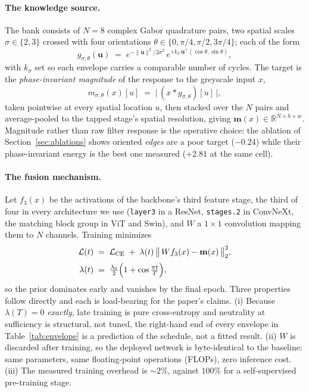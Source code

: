 \paragraph{The knowledge source.} The bank consists of $N{=}8$ complex
Gabor quadrature pairs, two spatial scales $\sigma \in \{2,3\}$ crossed
with four orientations $\theta \in \{0, \pi/4, \pi/2, 3\pi/4\}$; each
of the form
\begin{equation}
  g_{\sigma,\theta}(\mathbf{u}) \;=\;
  e^{-\lVert \mathbf{u}\rVert^{2}/2\sigma^{2}}\,
  e^{\,i\,k_\sigma\, \mathbf{u}^{\!\top} (\cos\theta, \sin\theta)},
  \label{eq:gabor}
\end{equation}
with $k_\sigma$ set so each envelope carries a comparable number of
cycles. The target is the \emph{phase-invariant magnitude} of the
response to the greyscale input $x$,
\begin{equation}
  m_{\sigma,\theta}(x)[u] \;=\; \bigl|\, (x * g_{\sigma,\theta})[u] \,\bigr|,
  \label{eq:energy}
\end{equation}
taken pointwise at every spatial location $u$, then stacked over the $N$
pairs and average-pooled to the tapped stage's
spatial resolution, giving $\mathbf{m}(x)\in\mathbb{R}^{N\times h\times w}$.
Magnitude rather than raw filter response is the operative choice: the
ablation of Section~\ref{sec:ablations} shows oriented \emph{edges} are a
poor target ($-0.24$) while their phase-invariant energy is the best one
measured ($+2.81$ at the same cell).

\paragraph{The fusion mechanism.} Let $f_3(x)$ be the activations of the
backbone's third feature stage, the third of four in every architecture we
use (\texttt{layer3} in a ResNet, \texttt{stages.2} in ConvNeXt, the
matching block group in ViT and Swin), and $W$ a $1{\times}1$ convolution
mapping them to $N$ channels. Training minimizes
\begin{equation}
  \begin{aligned}
    \mathcal{L}(t) &\;=\; \mathcal{L}_{\mathrm{CE}}
      \;+\; \lambda(t)\,
      \bigl\lVert\, W f_3(x) - \mathbf{m}(x) \,\bigr\rVert_2^2,\\[2pt]
    \lambda(t) &\;=\; \tfrac{\lambda_0}{2}
      \Bigl(1+\cos\tfrac{\pi t}{T}\Bigr),
  \end{aligned}
  \label{eq:loss}
\end{equation}
so the prior dominates early and vanishes by the final epoch. Three
properties follow directly and each is load-bearing for the paper's
claims. (i) Because $\lambda(T)=0$ \emph{exactly}, late training is pure
cross-entropy and neutrality at sufficiency is structural, not tuned,
the right-hand end of every envelope in Table~\ref{tab:envelope} is a
prediction of the schedule, not a fitted result. (ii) $W$ is discarded
after training, so the deployed network is byte-identical to the
baseline: same parameters, same floating-point operations (FLOPs), zero
inference cost. (iii) The
measured training overhead is ${\sim}2\%$, against $100\%$ for a
self-supervised pre-training stage.


